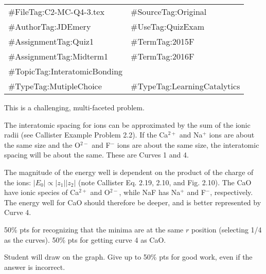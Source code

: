 \begin{FileID}
	\begin{center}
		\begin{tabular}{ll}
			\hline
			\hline
			\#FileTag:C2-MC-Q4-3.tex & 	\#SourceTag:Original\\ %
			\#AuthorTag:JDEmery & \#UseTag:QuizExam\\ %
			\hline
			\#AssignmentTag:Quiz1& \#TermTag:2015F \\ %
			\#AssignmentTag:Midterm1& \#TermTag:2016F \\ %
			\hline
			\#TopicTag:InteratomicBonding & \\ %
			\hline
			\#TypeTag:MutipleChoice & \#TypeTag:LearningCatalytics\\
			\hline
		\end{tabular}
	\end{center}
\end{FileID}

\begin{solution}

This is a challenging, multi-faceted problem.

The interatomic spacing for ions can be approximated by the sum of the ionic radii (see Callister Example Problem 2.2). If the Ca$^{2+}$ and Na$^{+}$ ions are about the same size and the O$^{2-}$ and F$^{-}$ ions are about the same size, the interatomic spacing will be about the same. These are Curves 1 and 4.

The magnitude of the energy well is dependent on the product of the charge of the ions: $|E_{\text{0}}| \propto |z_{1}||z_{2}|$ (note Callister Eq. 2.19, 2.10, and Fig. 2.10). The CaO have ionic species of Ca$^{2+}$ and O$^{2-}$, while NaF has Na$^{+}$ and F$^{-}$, respectively. The energy well for CaO should therefore be deeper, and is better represented by Curve 4.

\end{solution}

\begin{rubric}

50\% pts for recognizing that the minima are at the same $r$ position (selecting 1/4 as the curves).
50\% pts for getting curve 4 as CaO.

Student will draw on the graph. Give up to 50\% pts for good work, even if the answer is incorrect.

\end{rubric}

